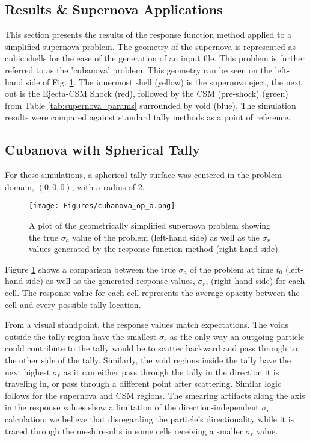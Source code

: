 \begin{chapabstract}
\section{Results \& Supernova Applications}
This section presents the results of the response function method applied to a simplified supernova problem. The geometry of the supernova is represented as cubic shells for the ease of the generation of an input file. This problem is further referred to as the 'cubanova' problem. This geometry can be seen on the left-hand side of Fig. \ref{fig:cubanova_op_a}. The innermost shell (yellow) is the supernova eject, the next out is the Ejecta-CSM Shock (red), followed by the CSM (pre-shock) (green) from Table \ref{tab:supernova_params} surrounded by void (blue). The simulation results were compared against standard tally methods as a point of reference. 

\subsection{Cubanova with Spherical Tally}

For these simulations, a spherical tally surface was centered in the problem domain, $(0,0,0)$, with a radius of $2$. 

\begin{figure} [h!]
	\centering
	\texttt{[image: Figures/cubanova\_op\_a.png]}
	\caption{A plot of the geometrically simplified supernova problem showing the true $\sigma_{a}$ value of the problem (left-hand side) as well as the $\sigma_{r}$ values generated by the response function method (right-hand side).}
	\label{fig:cubanova_op_a}
\end{figure}

Figure \ref{fig:cubanova_op_a} shows a comparison between the true $\sigma_{a}$ of the problem at time $t_{0}$ (left-hand side) as well as the generated response values, $\sigma_{r}$, (right-hand side) for each cell. The response value for each cell represents the average opacity between the cell and every possible tally location. 

From a visual standpoint, the response values match expectations. The voids outside the tally region have the smallest $\sigma_{r}$ as the only way an outgoing particle could contribute to the tally would be to scatter backward and pass through to the other side of the tally. Similarly, the void regions inside the tally have the next highest $\sigma_{r}$ as it can either pass through the tally in the direction it is traveling in, or pass through a different point after scattering. Similar logic follows for the supernova and CSM regions. The smearing artifacts along the axis in the response values show a limitation of the direction-independent $\sigma_{r}$ calculation; we believe that disregarding the particle's directionality while it is traced through the mesh results in some cells receiving a smaller $\sigma_{r}$ value.


\end{chapabstract}
